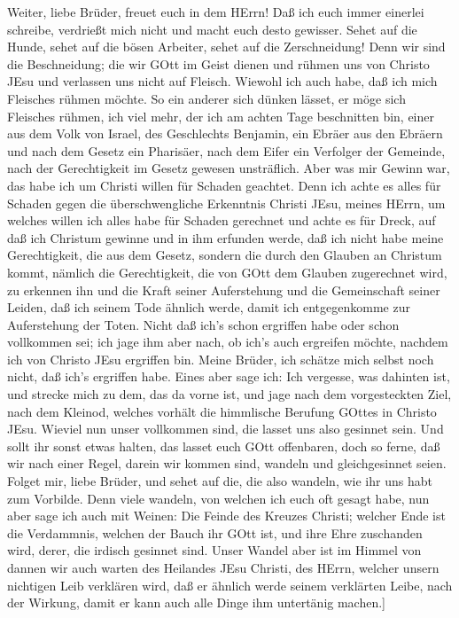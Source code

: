  Weiter, liebe Brüder, freuet euch in dem HErrn! Daß ich
euch immer einerlei schreibe, verdrießt mich nicht und macht euch desto
gewisser.  Sehet auf die Hunde, sehet auf die bösen
Arbeiter, sehet auf die Zerschneidung!  Denn wir sind die
Beschneidung; die wir GOtt im Geist dienen und rühmen uns von Christo
JEsu und verlassen uns nicht auf Fleisch.  Wiewohl ich auch
habe, daß ich mich Fleisches rühmen möchte. So ein anderer sich dünken
lässet, er möge sich Fleisches rühmen, ich viel mehr,  der
ich am achten Tage beschnitten bin, einer aus dem Volk von Israel, des
Geschlechts Benjamin, ein Ebräer aus den Ebräern und nach dem Gesetz ein
Pharisäer,  nach dem Eifer ein Verfolger der Gemeinde, nach
der Gerechtigkeit im Gesetz gewesen unsträflich.  Aber was
mir Gewinn war, das habe ich um Christi willen für Schaden geachtet.
 Denn ich achte es alles für Schaden gegen die
überschwengliche Erkenntnis Christi JEsu, meines HErrn, um welches
willen ich alles habe für Schaden gerechnet und achte es für Dreck, auf
daß ich Christum gewinne  und in ihm erfunden werde, daß ich
nicht habe meine Gerechtigkeit, die aus dem Gesetz, sondern die durch
den Glauben an Christum kommt, nämlich die Gerechtigkeit, die von GOtt
dem Glauben zugerechnet wird,  zu erkennen ihn und die
Kraft seiner Auferstehung und die Gemeinschaft seiner Leiden, daß ich
seinem Tode ähnlich werde,  damit ich entgegenkomme zur
Auferstehung der Toten.  Nicht daß ich's schon ergriffen
habe oder schon vollkommen sei; ich jage ihm aber nach, ob ich's auch
ergreifen möchte, nachdem ich von Christo JEsu ergriffen bin.
 Meine Brüder, ich schätze mich selbst noch nicht, daß
ich's ergriffen habe. Eines aber sage ich: Ich vergesse, was dahinten
ist, und strecke mich zu dem, das da vorne ist,  und jage
nach dem vorgesteckten Ziel, nach dem Kleinod, welches vorhält die
himmlische Berufung GOttes in Christo JEsu.  Wieviel nun
unser vollkommen sind, die lasset uns also gesinnet sein. Und sollt ihr
sonst etwas halten, das lasset euch GOtt offenbaren,  doch
so ferne, daß wir nach einer Regel, darein wir kommen sind, wandeln und
gleichgesinnet seien.  Folget mir, liebe Brüder, und sehet
auf die, die also wandeln, wie ihr uns habt zum Vorbilde. 
Denn viele wandeln, von welchen ich euch oft gesagt habe, nun aber sage
ich auch mit Weinen: Die Feinde des Kreuzes Christi; 
welcher Ende ist die Verdammnis, welchen der Bauch ihr GOtt ist, und
ihre Ehre zuschanden wird, derer, die irdisch gesinnet sind.
 Unser Wandel aber ist im Himmel von dannen wir auch warten
des Heilandes JEsu Christi, des HErrn,  welcher unsern
nichtigen Leib verklären wird, daß er ähnlich werde seinem verklärten
Leibe, nach der Wirkung, damit er kann auch alle Dinge ihm untertänig
machen.{]}

